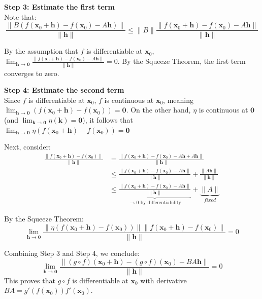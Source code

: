 \documentclass[12pt]{article}
\begin{document}
\begin{dbox}
\begin{pf}
\vspace{0.8em}
\noindent \textbf{Step 3: Estimate the first term} \\
Note that:
$$\frac{\|B(f(\mathbf{x}_0+\mathbf{h}) - f(\mathbf{x}_0) - A\mathbf{h})\|}{\|\mathbf{h}\|} \le \|B\| \frac{\|f(\mathbf{x}_0+\mathbf{h}) - f(\mathbf{x}_0) - A\mathbf{h}\|}{\|\mathbf{h}\|}$$ 

By the assumption that $f$ is differentiable at $\mathbf{x}_0$, $\lim_{\mathbf{h} \to \mathbf{0}} \frac{\|f(\mathbf{x}_0+\mathbf{h}) - f(\mathbf{x}_0) - A\mathbf{h}\|}{\|\mathbf{h}\|} = 0$. By the Squeeze Theorem, the first term converges to zero.

\vspace{0.8em}
\noindent \textbf{Step 4: Estimate the second term} \\
Since $f$ is differentiable at $\mathbf{x}_0$, $f$ is continuous at $\mathbf{x}_0$, meaning $\lim_{\mathbf{h} \to \mathbf{0}} (f(\mathbf{x}_0+\mathbf{h}) - f(\mathbf{x}_0)) = \mathbf{0}$.
On the other hand, $\eta$ is continuous at $\mathbf{0}$ (and $\lim_{\mathbf{k} \to \mathbf{0}} \eta(\mathbf{k}) = \mathbf{0}$), it follows that $\lim_{\mathbf{h} \to \mathbf{0}} \eta(f(\mathbf{x}_0+\mathbf{h}) - f(\mathbf{x}_0)) = \mathbf{0}$

Next, consider:
\begin{align*}
\frac{\|f(\mathbf{x}_0+\mathbf{h}) - f(\mathbf{x}_0)\|}{\|\mathbf{h}\|} &= \frac{\|f(\mathbf{x}_0+\mathbf{h}) - f(\mathbf{x}_0) - A\mathbf{h} + A\mathbf{h}\|}{\|\mathbf{h}\|} \\
&\le \frac{\|f(\mathbf{x}_0+\mathbf{h}) - f(\mathbf{x}_0) - A\mathbf{h}\|}{\|\mathbf{h}\|} + \frac{\|A\mathbf{h}\|}{\|\mathbf{h}\|} \\
&\le \underbrace{\frac{\|f(\mathbf{x}_0+\mathbf{h}) - f(\mathbf{x}_0) - A\mathbf{h}\|}{\|\mathbf{h}\|}}_{\to 0\text{ by differentiability}} + \underbrace{\|A\|}_{fixed}
\end{align*} 

By the Squeeze Theorem:
$$\lim_{\mathbf{h} \to \mathbf{0}} \frac{\|\eta(f(\mathbf{x}_0+\mathbf{h}) - f(\mathbf{x}_0))\| \|f(\mathbf{x}_0+\mathbf{h}) - f(\mathbf{x}_0)\|}{\|\mathbf{h}\|} = 0$$

Combining Step 3 and Step 4, we conclude:
$$\lim_{\mathbf{h} \to \mathbf{0}} \frac{\|(g \circ f)(\mathbf{x}_0+\mathbf{h}) - (g \circ f)(\mathbf{x}_0) - BA\mathbf{h}\|}{\|\mathbf{h}\|} = 0$$ 
This proves that $g \circ f$ is differentiable at $\mathbf{x}_0$ with derivative $BA = g'(f(\mathbf{x}_0)) f'(\mathbf{x}_0)$.
\end{pf}
\end{dbox}
\end{document}
